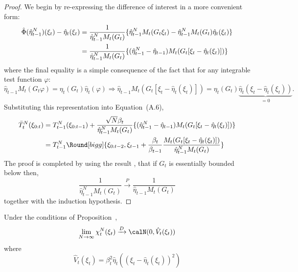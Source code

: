 \begin{proof}
  We begin by re-expressing the difference of interest in a more convenient form:
  \begin{align}
    \hat\Phi(\hat\eta_{t-1}^N)(\xi_t) - \hat\eta_t(\xi_t)
    &= \frac{1}{\hat\eta_{t-1}^NM_t(G_t)}\{
    \hat\eta_{t-1}^NM_t(G_t\xi_t) -
    \hat\eta_{t-1}^NM_t(G_t)\hat\eta_t(\xi_t)\} \notag\\
    &= \frac{1}{\hat\eta_{t-1}^NM_t(G_t)}
    \{(\hat\eta_{t-1}^N-\hat\eta_{t-1})M_t(G_t[\xi_t-\hat\eta_t(\xi_t)])\}
  \end{align}
  where the final equality is a simple consequence of the fact that for any
  integrable test function $\varphi$:
  \begin{equation*}
    \hat\eta_{t-1} M_t (G_t \varphi) = \eta_t(G_t) \hat\eta_t(\varphi)
    \Rightarrow
    \hat\eta_{t-1} M_t (G_t [\xi_t - \hat\eta_t(\xi_t)]) = \eta_t(G_t)
    \underset{=0}{\underbrace{\hat\eta_t(\xi_t - \hat\eta_t(\xi_t))}} .
  \end{equation*}
  Substituting this representation into Equation~{\allcapt (A.6)},
  \begin{align}
    \bar{T}_t^N(\xi_{0:t})
    &= T_{t-1}^N(\xi_{0:t-1}) +
    \frac{\sqrt{N}\beta_t}{\hat\eta_{t-1}^NM_t(G_t)}
    \{(\hat\eta_{t-1}^N-\hat\eta_{t-1})M_t(G_t[\xi_t-\hat\eta_t(\xi_t)])\}
    \notag\\
    &= T_{t-1}^N\Round[bigg]{\xi_{0:t-2},
      \xi_{t-1} + \frac{\beta_t}{\beta_{t-1}}
      \frac{M_t(G_t[\xi_t-\hat\eta_t(\xi_t)])}{\hat\eta_{t-1}^NM_t(G_t)}}
  \end{align}
  The proof is completed by using the result
  \cite[][sec.~7.4.3]{DelMoral:2004ux}, that if $G_t$ is essentially bounded
  below then,
  \begin{equation*}
    \frac{1}{\hat\eta_{t-1}^NM_t(G_t)} \xrightarrow{P}
    \frac{1}{\hat\eta_{t-1}M_t(G_t)}
  \end{equation*}
  together with the induction hypothesis.
\end{proof}

\begin{lemma}\label{lem:sampling}
  Under the conditions of Proposition~,
  \begin{equation}
    \lim_{N\to\infty}\chi_t^N(\xi_t)\xrightarrow{D}\calN(0, \hat{V}_t(\xi_t))
  \end{equation}
  where
  \begin{equation}
    \hat{V}_t(\xi_t) = \beta_t^2\hat\eta_t((\xi_t - \hat\eta_t(\xi_t))^2)
  \end{equation}
\end{lemma}

